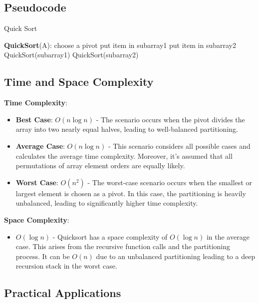 \documentclass[sigplan,screen]{acmart}
\begin{document}
\subsection{Pseudocode}

\begin{algorithm}[H]
  \captionsetup{justification=centering}
  \caption{Quick Sort}
\begin{algorithmic}[1]
  \State \textbf{QuickSort}(A):
    \State choose a pivot
      \State put item in subarray1
    \Else 
      \State put item in subarray2
    \EndIf
    \EndWhile
  \State QuickSort(subarray1)
  \State QuickSort(subarray2)
  \EndIf
\end{algorithmic}
\end{algorithm}


\subsection{Time and Space Complexity}

\textbf{Time Complexity}:
\begin{itemize}
    \item \textbf{Best Case}: $O(n \log n)$ - The scenario occurs when the pivot divides the array into two nearly equal halves, leading to well-balanced partitioning.
    \item \textbf{Average Case}: $O(n \log n)$ - This scenario considers all possible cases and calculates the average time complexity. Moreover, it's assumed that all permutations of array element orders are equally likely.
    \item \textbf{Worst Case}: $O(n^2)$ - The worst-case scenario occurs when the smallest or largest element is chosen as a pivot. In this case, the partitioning is heavily unbalanced, leading to significantly higher time complexity.
\end{itemize}

\textbf{Space Complexity}:
\begin{itemize}
    \item $O(\log n)$ - Quicksort has a space complexity of $O(\log n)$ in the average case. 
    This arises from the recursive function calls and the partitioning process. It can be $O(n)$ 
    due to an unbalanced partitioning leading to a deep recursion stack in the worst case.
\end{itemize}

\subsection{Practical Applications}
\end{document}
